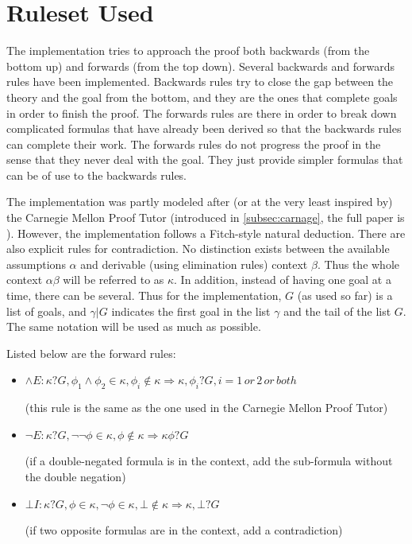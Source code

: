 \documentclass[11pt,twoside,a4paper]{report}
\begin{document}
\section{Ruleset Used}
The implementation tries to approach the proof both backwards (from the bottom up) and forwards (from the top down). Several backwards and forwards rules have been implemented. Backwards rules try to close the gap between the theory and the goal from the bottom, and they are the ones that complete goals in order to finish the proof. The forwards rules are there in order to break down complicated formulas that have already been derived so that the backwards rules can complete their work. The forwards rules do not progress the proof in the sense that they never deal with the goal. They just provide simpler formulas that can be of use to the backwards rules.

The implementation was partly modeled after (or at the very least inspired by) the Carnegie Mellon Proof Tutor (introduced in \autoref{subsec:carnage}, the full paper is \citep{siegfried}). However, the implementation follows a Fitch-style natural deduction. There are also explicit rules for contradiction. No distinction exists between the available assumptions $\alpha$ and derivable (using elimination rules) context $\beta$. Thus the whole context $\alpha\beta$ will be referred to as $\kappa$. In addition, instead of having one goal at a time, there can be several. Thus for the implementation, $G$ (as used so far) is a list of goals, and $\gamma|G$ indicates the first goal in the list $\gamma$ and the tail of the list $G$. The same notation will be used as much as possible.

Listed below are the forward rules:

\begin{itemize}
\item
$\wedge E: \kappa?G, \phi_1\wedge\phi_2\in\kappa, \phi_i\notin\kappa \Rightarrow \kappa,\phi_i?G, i = 1\, or\, 2\, or\, both$

(this rule is the same as the one used in the Carnegie Mellon Proof Tutor)
\item
$\neg E: \kappa?G, \neg\neg\phi\in\kappa, \phi\notin\kappa \Rightarrow \kappa\phi?G$

(if a double-negated formula is in the context, add the sub-formula without the double negation)
\item
$\bot I: \kappa?G, \phi\in\kappa, \neg\phi\in\kappa, \bot\notin\kappa \Rightarrow \kappa,\bot?G$

(if two opposite formulas are in the context, add a contradiction)
\end{itemize}
\end{document}
